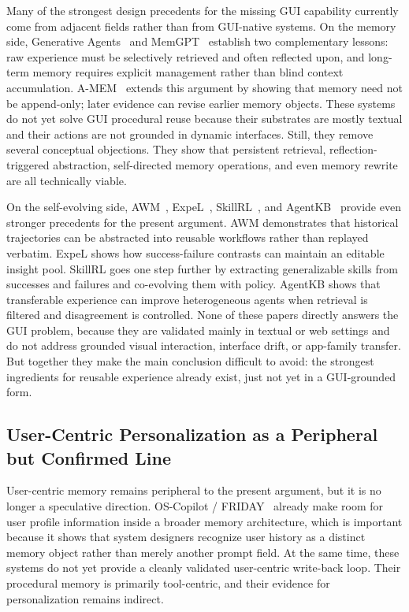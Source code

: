\documentclass{article}
\begin{document}
Many of the strongest design precedents for the missing GUI capability
currently come from adjacent fields rather than from GUI-native systems.
On the memory side, Generative
Agents~\parencite{park2023generativeagentsinteractivesimulacra} and
MemGPT~\parencite{packer2024memgptllmsoperatingsystems} establish two complementary
lessons: raw experience must be selectively retrieved and often
reflected upon, and long-term memory requires explicit management
rather than blind context accumulation.
A-MEM~\parencite{xu2025amemagenticmemoryllm} extends this argument by showing that
memory need not be append-only; later evidence can revise earlier
memory objects. These systems do not yet solve GUI procedural reuse
because their substrates are mostly textual and their actions are not
grounded in dynamic interfaces. Still, they remove several conceptual
objections. They show that persistent retrieval,
reflection-triggered abstraction, self-directed memory operations, and
even memory rewrite are all technically viable.

On the self-evolving side, AWM~\parencite{wang2024agentworkflowmemory},
ExpeL~\parencite{zhao2024expelllmagentsexperiential},
SkillRL~\parencite{xia2026skillrlevolvingagentsrecursive}, and
AgentKB~\parencite{tang2025agentkbleveragingcrossdomain} provide even stronger precedents
for the present argument. AWM demonstrates that historical trajectories
can be abstracted into reusable workflows rather than replayed
verbatim. ExpeL shows how success-failure contrasts can maintain an
editable insight pool. SkillRL
goes one step further by extracting generalizable skills from successes
and failures and co-evolving them with policy. AgentKB shows that
transferable experience can improve heterogeneous agents when retrieval
is filtered and disagreement is controlled. None of these papers
directly answers the GUI problem, because they are validated mainly in
textual or web settings and do not address grounded visual interaction,
interface drift, or app-family transfer. But together they make the main
conclusion difficult to avoid: the strongest ingredients for reusable
experience already exist, just not yet in a GUI-grounded form.

\subsection{User-Centric Personalization as a Peripheral but Confirmed Line}\label{55-user-centric-personalization-as-a-peripheral-but-confirmed-line}

User-centric memory remains peripheral to the present argument, but it
is no longer a speculative direction. OS-Copilot /
FRIDAY~\parencite{wu2024oscopilotgeneralistcomputeragents} already make room for user profile
information inside a broader memory architecture, which is important
because it shows that system designers recognize user history as a
distinct memory object rather than merely another prompt field. At the
same time, these systems do not yet provide a cleanly validated
user-centric write-back loop. Their procedural memory is primarily
tool-centric, and their evidence for personalization remains indirect.
\end{document}
